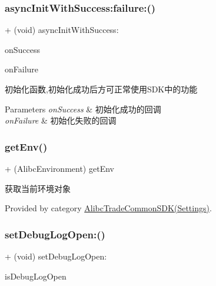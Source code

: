 \subsubsection{\texorpdfstring{async\+Init\+With\+Success\+:failure\+:()}{asyncInitWithSuccess:failure:()}}
{\footnotesize\ttfamily + (void) async\+Init\+With\+Success\+: \begin{DoxyParamCaption}\item[{(void($^\wedge$)())}]{on\+Success }\item[{failure:(void($^\wedge$)(N\+S\+Error $\ast$error))}]{on\+Failure }\end{DoxyParamCaption}}

初始化函数,初始化成功后方可正常使用\+S\+D\+K中的功能


\begin{DoxyParams}{Parameters}
{\em on\+Success} & 初始化成功的回调 \\
\hline
{\em on\+Failure} & 初始化失败的回调 \\
\hline
\end{DoxyParams}
\mbox{\label{interface_alibc_trade_common_s_d_k_a52fffd9cecf92db99a9c187677a531da}} 
\subsubsection{\texorpdfstring{get\+Env()}{getEnv()}}
{\footnotesize\ttfamily + (Alibc\+Environment) get\+Env \begin{DoxyParamCaption}{ }\end{DoxyParamCaption}}

获取当前环境对象 

Provided by category \mbox{\hyperlink{category_alibc_trade_common_s_d_k_07_settings_08_a52fffd9cecf92db99a9c187677a531da}{Alibc\+Trade\+Common\+S\+D\+K(\+Settings)}}.

\mbox{\label{interface_alibc_trade_common_s_d_k_a078b422151a1f58252df135495ca6672}} 
\subsubsection{\texorpdfstring{set\+Debug\+Log\+Open\+:()}{setDebugLogOpen:()}}
{\footnotesize\ttfamily + (void) set\+Debug\+Log\+Open\+: \begin{DoxyParamCaption}\item[{(B\+O\+OL)}]{is\+Debug\+Log\+Open }\end{DoxyParamCaption}}

